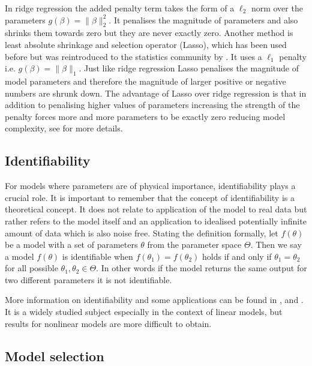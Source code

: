 In ridge regression the added penalty term takes the form of a $\ell_2$ norm over the parameters $g(\beta) = \lVert \beta \rVert_2^2$. It penalises the magnitude of parameters and also shrinks them towards zero but they are never exactly zero. Another method is least absolute shrinkage and selection operator (Lasso), which has been used before but was reintroduced to the statistics community by \cite{Tibshirani:1996wba}. It uses a $\ell_1$ penalty i.e. $g(\beta) = \lVert \beta \rVert_1$. Just like ridge regression Lasso penalises the magnitude of model parameters and therefore the magnitude of larger positive or negative numbers are shrunk down. The advantage of Lasso over ridge regression is that in addition to penalising higher values of parameters increasing the strength of the penalty forces more and more parameters to be exactly zero reducing model complexity, see \cite{hastie2001elements} for more details.

\subsection{Identifiability}
\label{sec:identifiability-back}

For models where parameters are of physical importance, identifiability plays a crucial role. It is important to remember that the concept of identifiability is a theoretical concept. It does not relate to application of the model to real data but rather refers to the model itself and an application to idealised potentially infinite amount of data which is also noise free. Stating the definition formally, let $f(\theta)$ be a model with a set of parameters $\theta$ from the parameter space $\Theta$. Then we say a model $f(\theta)$ is identifiable when $f(\theta_1) = f(\theta_2)$ holds if and only if $\theta_1 = \theta_2$ for all possible $\theta_1, \theta_2 \in \Theta$. In other words if the model returns the same output for two different parameters it is not identifiable.

More information on identifiability and some applications can be found in \cite{Saccomani:2003kx},  \cite{Saccomani:2010by} and \cite{Jacquez:1985fz}. It is a widely studied subject especially in the context of linear models, but results for nonlinear models are more difficult to obtain.

\subsection{Model selection}
\label{sec:model-selection-1}

